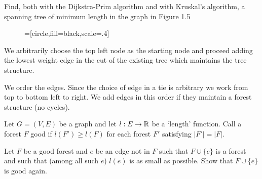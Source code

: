 \documentclass[10pt]{article}
\begin{document}
\maketitle

\begin{problem}[Exercise 1.7]
Find, both with the Dijkstra-Prim algorithm and with Kruskal's algorithm, a spanning tree of minimum length in the graph in Figure 1.5

\begin{figure}[h]\centering
{}=[circle,fill=black,scale=.4]
    \caption{}
\end{figure}
\end{problem}

\begin{solution}[Solution]
We arbitrarily choose the top left node as the starting node and proceed adding the lowest weight edge in the cut of the existing tree which maintains the tree structure.


We order the edges. Since the choice of edge in a tie is arbitrary we work from top to bottom left to right. We add edges in this order if they maintain a forest structure (no cycles).

\end{solution}


\begin{problem}[Exercise 1.9]
    Let \( G=(V,E) \) be a graph and let \( l:E\to \mathbb{R} \) be a `length' function. Call a forest \( F \) good if \( l(F') \geq l(F) \) for each forest \( F' \) satisfying \( |F'|=|F| \).

    Let \( F \) be a good forest and \( e \) be an edge not in \( F \) such that \( F\cup\{e\} \) is a forest and such that (among all such \( e \)) \( l(e) \) is as small as possible. Show that \( F\cup\{e\} \) is good again.
\end{problem}
\end{document}
